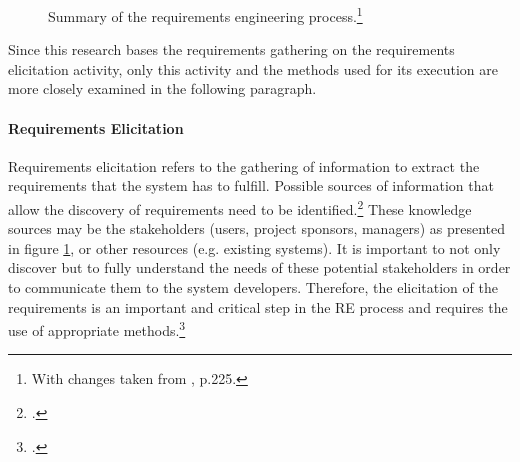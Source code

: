 \begin{figure}
    \centering
    
    \caption[Summary of the requirements engineering process.]{Summary of the requirements engineering process.\footnote{With changes taken from \cite{ZhangEffectiverequirementsdevelopmentA2007}, p.225.}}
    \label{fig:REAll}
\end{figure}
Since this research bases the requirements gathering on the requirements elicitation activity, only this activity and the methods used for its execution are more closely examined in the following paragraph. 

\paragraph{Requirements Elicitation} Requirements elicitation refers to the gathering of information to extract the requirements that the system has to fulfill. Possible sources of information that allow the discovery of requirements need to be identified.\footcites[Cf.][p.2]{TiwariMethodologySelectionRequirement2017}[cf.][p.17]{SommervilleIntegratedrequirementsengineering2005} These knowledge sources may be the stakeholders (users, project sponsors, managers) as presented in figure \ref{fig:REAll}, or other resources (e.g. existing systems). It is important to not only discover but to fully understand the needs of these potential stakeholders in order to communicate them to the system developers. Therefore, the elicitation of the requirements is an important and critical step in the RE process and requires the use of appropriate methods.\footcites[Cf.][p.232]{ZhangEffectiverequirementsdevelopmentA2007}[cf.][pp.19 et seq]{ZowghiRequirementselicitationsurvey2005}

